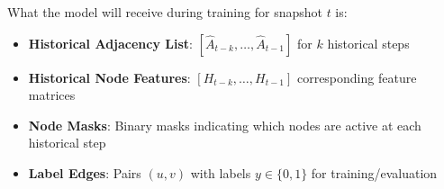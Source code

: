 What the model will receive during training for snapshot $t$ is:

\begin{itemize}
	\item \textbf{Historical Adjacency List}: $[\hat{A}_{t-k}, \ldots, \hat{A}_{t-1}]$ for $k$ historical steps
	\item \textbf{Historical Node Features}: $[H_{t-k}, \ldots, H_{t-1}]$ corresponding feature matrices
	\item \textbf{Node Masks}: Binary masks indicating which nodes are active at each historical step
	\item \textbf{Label Edges}: Pairs $(u, v)$ with labels $y \in \{0, 1\}$ for training/evaluation
\end{itemize}

